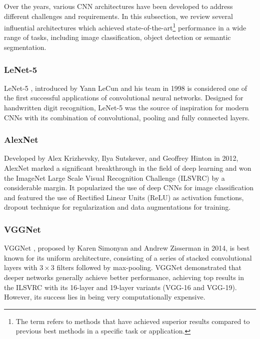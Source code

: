 
Over the years, various CNN architectures have been developed to address
different challenges and requirements. In this subsection, we review several
influential architectures which achieved state-of-the-art\footnote{The term
 refers to methods that have achieved superior results
compared to previous best methods in a specific task or application.}
performance in a wide range of tasks, including image classification, object
detection or semantic segmentation.


\subsubsection{LeNet-5}

LeNet-5 \cite{Lecun1998}, introduced by Yann LeCun and his team in 1998 is
considered one of the first successful applications of convolutional neural
networks. Designed for handwritten digit recognition, LeNet-5 was the source of
inspiration for modern CNNs with its combination of convolutional, pooling and
fully connected layers.


\subsubsection{AlexNet}

Developed by Alex Krizhevsky, Ilya Sutskever, and Geoffrey Hinton in 2012,
AlexNet \cite{NIPS2012} marked a significant breakthrough in the field of deep
learning and won the ImageNet Large Scale Visual Recognition Challenge (ILSVRC)
by a considerable margin. It popularized the use of deep CNNs for image
classification and featured the use of Rectified Linear Units (ReLU) as
activation functions, dropout technique for regularization and data
augmentations for training.


\subsubsection{VGGNet}

VGGNet \cite{Simonyan2014}, proposed by Karen Simonyan and Andrew Zisserman in
2014, is best known for its uniform architecture, consisting of a series of
stacked convolutional layers with $3 \times 3$ filters followed by max-pooling.
VGGNet demonstrated that deeper networks generally achieve better performance,
achieving top results in the ILSVRC with its 16-layer and 19-layer variants
(VGG-16 and VGG-19). However, its success lies in being very computationally
expensive.


